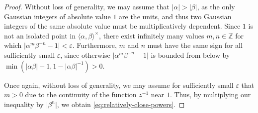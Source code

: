 \documentclass{amsart}
\newcommand{\Z}{\mathbb{Z}}
\newtheorem*{main theorem}{Theorem \ref{thm:main-gaussian}}
\theoremstyle{definition}
\begin{document}
\begin{proof}
    Without loss of generality, we may assume that $\lvert\alpha\rvert>\lvert\beta\rvert$, as the only Gaussian integers of absolute value $1$ are the units, and thus two Gaussian integers of the same absolute value must be multiplicatively dependent. Since $1$ is not an isolated point in $\langle\alpha,\beta\rangle^\times$, there exist infinitely many values $m,n\in\Z$ for which $\lvert \alpha ^m \beta^{-n} - 1\rvert<\varepsilon$. Furthermore, $m$ and $n$ must have the same sign for all sufficiently small $\varepsilon$, since otherwise $\lvert \alpha^m \beta^{-n} - 1\rvert$ is bounded from below by $\min(\lvert \alpha\beta\rvert - 1, 1- \lvert \alpha\beta\rvert^{-1})>0$.
    
    Once again, without loss of generality, we may assume for sufficiently small $\varepsilon$ that $m>0$ due to the continuity of the function $z^{-1}$ near $1$. Thus, by multiplying our inequality by $\lvert \beta^n\rvert$, we obtain \eqref{eq:relatively-close-powers}.
\end{proof}
\end{document}
